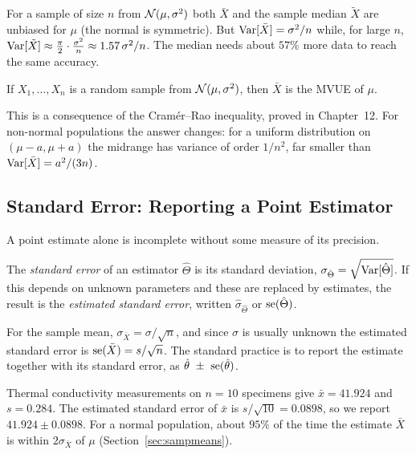 \begin{example}
For a sample of size $n$ from $\mathcal{N}(\mu,\sigma^2)$ both $\bar{X}$ and the sample median $\tilde{X}$ are unbiased for $\mu$ (the normal is symmetric). But $\operatorname{Var}[\bar{X}]=\sigma^2/n$ while, for large $n$, $\operatorname{Var}[\tilde{X}]\approx\frac\pi2\cdot\frac{\sigma^2}n\approx1.57\,\sigma^2/n$. The median needs about $57\%$ more data to reach the same accuracy.
\end{example}

\begin{theorem}\label{thm:mvue}
If $X_1,\dots,X_n$ is a random sample from $\mathcal{N}(\mu,\sigma^2)$, then $\bar{X}$ is the MVUE of $\mu$.
\end{theorem}

This is a consequence of the Cram\'er--Rao inequality, proved in Chapter~12. For non-normal populations the answer changes: for a uniform distribution on $(\mu-a,\mu+a)$ the midrange has variance of order $1/n^2$, far smaller than $\operatorname{Var}[\bar{X}]=a^2/(3n)$.

\subsection{Standard Error: Reporting a Point Estimator}

A point estimate alone is incomplete without some measure of its precision.

\begin{definition}
The \emph{standard error} of an estimator $\hat\Theta$ is its standard deviation, $\sigma_{\hat\Theta}=\sqrt{\operatorname{Var}[\hat\Theta]}$. If this depends on unknown parameters and these are replaced by estimates, the result is the \emph{estimated standard error}, written $\hat\sigma_{\hat\Theta}$ or $\operatorname{se}(\hat\Theta)$.
\end{definition}

For the sample mean, $\sigma_{\bar{X}}=\sigma/\sqrt n$, and since $\sigma$ is usually unknown the estimated standard error is $\operatorname{se}(\bar{X})=s/\sqrt n$. The standard practice is to report the estimate together with its standard error, as $\hat\theta\ \pm\ \operatorname{se}(\hat\theta)$.

\begin{example}
Thermal conductivity measurements on $n=10$ specimens give $\bar{x}=41.924$ and $s=0.284$. The estimated standard error of $\bar{x}$ is $s/\sqrt{10}=0.0898$, so we report $41.924\pm0.0898$. For a normal population, about $95\%$ of the time the estimate $\bar{X}$ is within $2\sigma_{\bar{X}}$ of $\mu$ (Section~\ref{sec:sampmeans}).
\end{example}

